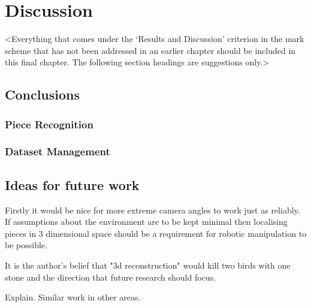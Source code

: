 \chapter{Discussion}
\label{chapter4}

<Everything that comes under the `Results and Discussion' criterion in the mark scheme that has not been addressed in an earlier chapter should be included in this final chapter. The following section headings are suggestions only.>

\section{Conclusions}

\subsection{Piece Recognition}

\subsection{Dataset Management}

\section{Ideas for future work}
Firstly it would be nice for more extreme camera angles to work just as reliably.  If assumptions about the environment are to be kept minimal
then localising pieces in 3 dimensional space should be a requirement for robotic manipulation to be possible.

It is the author's belief that "3d reconstruction" would kill two birds with one stone and the direction that future research should focus.

Explain.  Similar work in other areas.